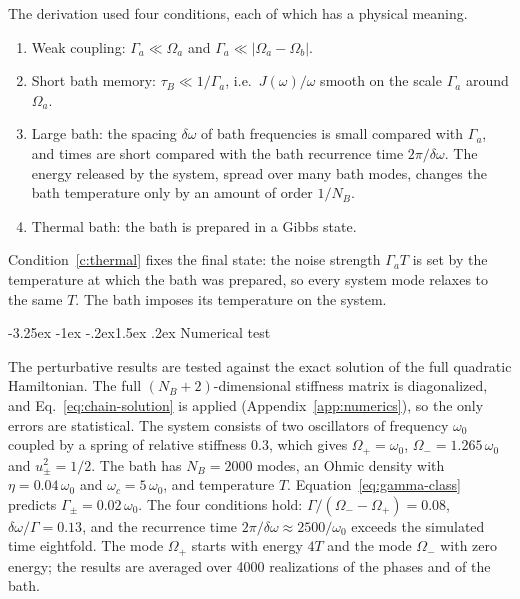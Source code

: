 \documentclass[10pt,a4paper]{article}
\makeatletter
\renewcommand{\subsection}{\@startsection{subsection}{2}{\z@}%
  {-3.25ex \@plus -1ex \@minus -.2ex}{1.5ex \@plus .2ex}%
  {\normalfont\fontsize{15.5pt}{19pt}\selectfont\bfseries}}
\makeatother
\begin{document}
The derivation used four conditions, each of which has a physical meaning.
\begin{enumerate}[label=(C\arabic*), leftmargin=3.0em]
\item \label{c:weak} Weak coupling: $ \Gamma_a \ll \Omega_a $ and $ \Gamma_a \ll |\Omega_a - \Omega_b| $.
\item \label{c:markov} Short bath memory: $ \tau_B \ll 1/\Gamma_a $, i.e.\ $ J(\omega)/\omega $ smooth on the scale $ \Gamma_a $ around $ \Omega_a $.
\item \label{c:large} Large bath: the spacing $ \delta\omega $ of bath frequencies is small compared with $ \Gamma_a $, and times are short compared with the bath recurrence time $ 2\pi/\delta\omega $. The energy released by the system, spread over many bath modes, changes the bath temperature only by an amount of order $ 1/N_B $.
\item \label{c:thermal} Thermal bath: the bath is prepared in a Gibbs state.
\end{enumerate}
Condition~\ref{c:thermal} fixes the final state: the noise strength $ \Gamma_a T $ is set by the temperature at which the bath was prepared, so every system mode relaxes to the same $ T $.
The bath imposes its temperature on the system.

\subsection{Numerical test}
\label{sec:bath-numerics}

The perturbative results are tested against the exact solution of the full quadratic Hamiltonian.
The full $ (N_B + 2) $-dimensional stiffness matrix is diagonalized, and Eq.~\eqref{eq:chain-solution} is applied (Appendix~\ref{app:numerics}), so the only errors are statistical.
The system consists of two oscillators of frequency $ \omega_0 $ coupled by a spring of relative stiffness $ 0.3 $, which gives $ \Omega_+ = \omega_0 $, $ \Omega_- = 1.265\,\omega_0 $ and $ u_\pm^2 = 1/2 $.
The bath has $ N_B = 2000 $ modes, an Ohmic density with $ \eta = 0.04\,\omega_0 $ and $ \omega_c = 5\,\omega_0 $, and temperature $ T $.
Equation~\eqref{eq:gamma-class} predicts $ \Gamma_\pm = 0.02\,\omega_0 $.
The four conditions hold: $ \Gamma/(\Omega_- - \Omega_+) = 0.08 $, $ \delta\omega/\Gamma = 0.13 $, and the recurrence time $ 2\pi/\delta\omega \approx 2500/\omega_0 $ exceeds the simulated time eightfold.
The mode $ \Omega_+ $ starts with energy $ 4T $ and the mode $ \Omega_- $ with zero energy; the results are averaged over 4000 realizations of the phases and of the bath.
\end{document}
